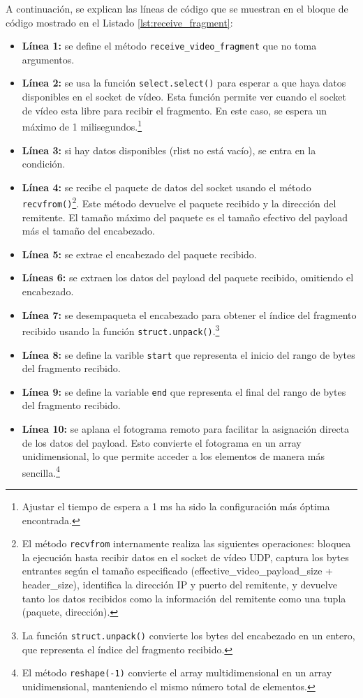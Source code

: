 A continuación, se explican las líneas de código que se muestran en el bloque de código mostrado en el Listado \ref{lst:receive_fragment}:
\begin{itemize}
    \item \textbf{Línea 1:} se define el método \texttt{receive\_video\_fragment} que no toma argumentos.
    \item \textbf{Línea 2:} se usa la función \texttt{select.select()} para esperar a que haya datos disponibles en el socket de vídeo. Esta función permite ver cuando el socket de vídeo esta libre para recibir el fragmento. En este caso, se espera un máximo de 1 milisegundos.\footnote{Ajustar el tiempo de espera a 1 ms ha sido la configuración más óptima encontrada.}
    \item \textbf{Línea 3:} si hay datos disponibles (rlist no está vacío), se entra en la condición.
    \item \textbf{Línea 4:} se recibe el paquete de datos del socket usando el método \texttt{recvfrom()}\footnote{El método \texttt{recvfrom} internamente realiza las siguientes operaciones: bloquea la ejecución hasta recibir datos en el socket de vídeo UDP, captura los bytes entrantes según el tamaño especificado (effective\_video\_payload\_size + header\_size), identifica la dirección IP y puerto del remitente, y devuelve tanto los datos recibidos como la información del remitente como una tupla (paquete, dirección).}. Este método devuelve el paquete recibido y la dirección del remitente. El tamaño máximo del paquete es el tamaño efectivo del payload más el tamaño del encabezado.
    \item \textbf{Línea 5:} se extrae el encabezado del paquete recibido.
    \item \textbf{Líneas 6:} se extraen los datos del payload del paquete recibido, omitiendo el encabezado.
    \item \textbf{Línea 7:} se desempaqueta el encabezado para obtener el índice del fragmento recibido usando la función \texttt{struct.unpack()}.\footnote{La función \texttt{struct.unpack()} convierte los bytes del encabezado en un entero, que representa el índice del fragmento recibido.}
    \item \textbf{Línea 8:} se define la varible \texttt{start} que representa el inicio del rango de bytes del fragmento recibido.
    \item \textbf{Línea 9:} se define la variable \texttt{end} que representa el final del rango de bytes del fragmento recibido.
    \item \textbf{Línea 10:} se aplana el fotograma remoto para facilitar la asignación directa de los datos del payload. Esto convierte el fotograma en un array unidimensional, lo que permite acceder a los elementos de manera más sencilla.\footnote{El método \texttt{reshape(-1)} convierte el array multidimensional en un array unidimensional, manteniendo el mismo número total de elementos.}

\end{itemize}
